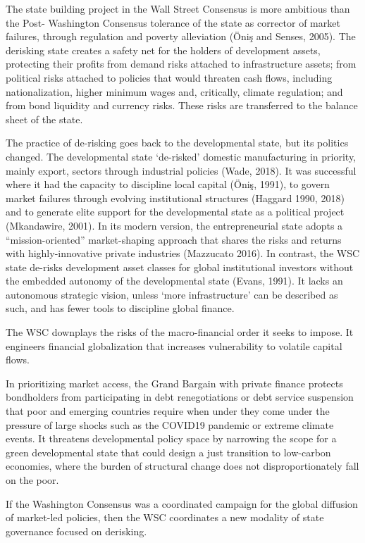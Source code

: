 \documentclass[
]{book}
\begin{document}
The state building project in the Wall Street Consensus is more ambitious than the Post-
Washington Consensus tolerance of the state as corrector of market failures, through
regulation and poverty alleviation (Öniş and Senses, 2005). The derisking state creates
a safety net for the holders of development assets, protecting their profits from demand
risks attached to infrastructure assets; from political risks attached to policies that would
threaten cash flows, including nationalization, higher minimum wages and, critically,
climate regulation; and from bond liquidity and currency risks. These risks are
transferred to the balance sheet of the state.

The practice of de-risking goes back to the developmental state, but its politics changed.
The developmental state `de-risked' domestic manufacturing in priority, mainly export,
sectors through industrial policies (Wade, 2018). It was successful where it had the
capacity to discipline local capital (Öniş, 1991), to govern market failures through
evolving institutional structures (Haggard 1990, 2018) and to generate elite support for
the developmental state as a political project (Mkandawire, 2001). In its modern
version, the entrepreneurial state adopts a ``mission-oriented'' market-shaping approach
that shares the risks and returns with highly-innovative private industries (Mazzucato
2016). In contrast, the WSC state de-risks development asset classes for global
institutional investors without the embedded autonomy of the developmental state
(Evans, 1991). It lacks an autonomous strategic vision, unless `more infrastructure' can
be described as such, and has fewer tools to discipline global finance.

The WSC downplays the risks of the macro-financial order it seeks to impose. It
engineers financial globalization that increases vulnerability to volatile capital flows.

In prioritizing market access, the Grand Bargain with private finance
protects bondholders from participating in debt renegotiations or debt service
suspension that poor and emerging countries require when under they come under the
pressure of large shocks such as the COVID19 pandemic or extreme climate events.
It threatens developmental policy space by narrowing the
scope for a green developmental state that could design a just transition to low-carbon
economies, where the burden of structural change does not disproportionately fall on
the poor.

If the Washington Consensus was a coordinated campaign for the global diffusion of
market-led policies, then the WSC coordinates a new modality of state governance
focused on derisking.
\end{document}
